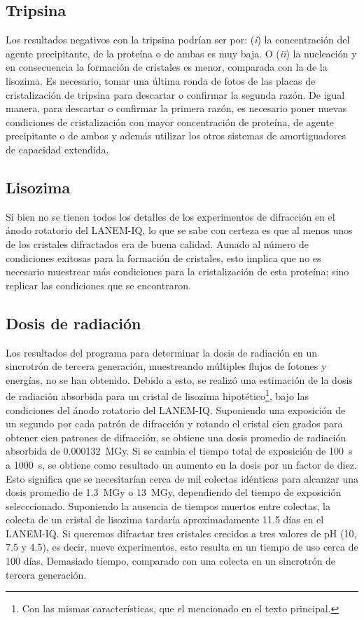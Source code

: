 \documentclass[11pt,letterpaper]{article}
\begin{document}
 	\subsection{Tripsina}
 	Los resultados negativos con la tripsina podrían ser por: (\emph{i}) la concentración del agente precipitante, de la proteína o de ambas es muy baja. O (\emph{ii}) la nucleación y en consecuencia la formación de cristales es menor, comparada con la de la lisozima. Es necesario, tomar una última ronda de fotos de las placas de cristalización de tripsina para descartar o confirmar la segunda razón. De igual manera, para descartar o confirmar la primera razón, es necesario poner nuevas condiciones de cristalización con mayor concentración de proteína, de agente precipitante o de ambos y además utilizar los otros sistemas de amortiguadores de capacidad extendida.
 	
 	\subsection{Lisozima}
 	Si bien no se tienen todos los detalles de los experimentos de difracción en el ánodo rotatorio del LANEM-IQ, lo que se sabe con certeza es que al menos unos de los cristales difractados era de buena calidad. Aunado al número de condiciones exitosas para la formación de cristales, esto implica que no es necesario muestrear más condiciones para la cristalización de esta proteína; sino replicar las condiciones que se encontraron.
 	
 	\subsection{Dosis de radiación}
 	Los resultados del programa para determinar la dosis de radiación en un sincrotrón de tercera generación, muestreando múltiples flujos de fotones y energías, no se han obtenido. Debido a esto, se realizó una estimación de la dosis de radiación absorbida para un cristal de lisozima hipotético\footnote{Con las mismas características, que el mencionado en el texto principal.}, bajo las condiciones del ánodo rotatorio del LANEM-IQ. Suponiendo una exposición de un segundo por cada patrón de difracción y rotando el cristal cien grados para obtener cien patrones de difracción, se obtiene una dosis promedio de radiación absorbida de \SI{0.000132}{\mega\gray}. Si se cambia el tiempo total de exposición de \SI{100}{\second} a \SI{1000}{\second}, se obtiene como resultado un aumento en la dosis por un factor de diez. Esto significa que se necesitarían cerca de mil colectas idénticas para alcanzar una dosis promedio de \SI{1.3}{\mega\gray} o \SI{13}{\mega\gray}, dependiendo del tiempo de exposición selecccionado. Suponiendo la ausencia de tiempos muertos entre colectas, la colecta de un cristal de lisozima tardaría aproximadamente 11.5 días en el LANEM-IQ. Si queremos difractar tres cristales crecidos a tres valores de pH (10, 7.5 y 4.5), es decir, nueve experimentos, esto resulta en un tiempo de uso cerca de 100 días. Demasiado tiempo, comparado con una colecta en un sincrotrón de tercera generación.
	 
\end{document}
